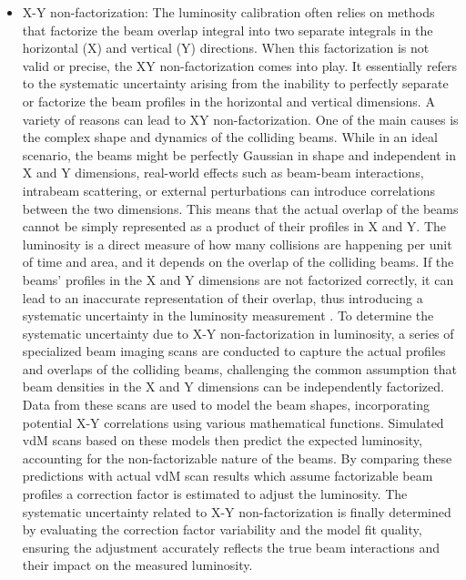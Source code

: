 \begin{itemize}
\item  X-Y non-factorization: The luminosity calibration often relies on methods that factorize the beam overlap integral into two separate integrals in the horizontal (X) and vertical (Y) directions. When this factorization is not valid or precise, the XY non-factorization comes into play. It essentially refers to the systematic uncertainty arising from the inability to perfectly separate or factorize the beam profiles in the horizontal and vertical dimensions. A variety of reasons can lead to XY non-factorization. One of the main causes is the complex shape and dynamics of the colliding beams. While in an ideal scenario, the beams might be perfectly Gaussian in shape and independent in X and Y dimensions, real-world effects such as beam-beam interactions, intrabeam scattering, or external perturbations can introduce correlations between the two dimensions. This means that the actual overlap of the beams cannot be simply represented as a product of their profiles in X and Y. The luminosity is a direct measure of how many collisions are happening per unit of time and area, and it depends on the overlap of the colliding beams. If the beams' profiles in the X and Y dimensions are not factorized correctly, it can lead to an inaccurate representation of their overlap, thus introducing a systematic uncertainty in the luminosity measurement \cite{CERNLUMPOG}. To determine the systematic uncertainty due to X-Y non-factorization in luminosity, a series of specialized beam imaging scans are conducted to capture the actual profiles and overlaps of the colliding beams, challenging the common assumption that beam densities in the X and Y dimensions can be independently factorized. Data from these scans are used to model the beam shapes, incorporating potential X-Y correlations using various mathematical functions. Simulated vdM scans based on these models then predict the expected luminosity, accounting for the non-factorizable nature of the beams. By comparing these predictions with actual vdM scan results which assume factorizable beam profiles a correction factor is estimated to adjust the luminosity. The systematic uncertainty related to X-Y non-factorization is finally determined by evaluating the correction factor variability and the model fit quality, ensuring the adjustment accurately reflects the true beam interactions and their impact on the measured luminosity.

  


\end{itemize}
